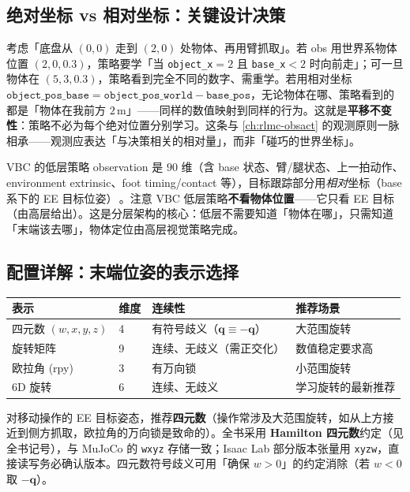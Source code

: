 \subsection{绝对坐标 vs 相对坐标：关键设计决策}
\label{sec:rlmc-lm-obs-rel}

\begin{insight}[相对坐标带来平移不变性]\label{ins:rlmc-lm-relcoord}
考虑「底盘从 $(0,0)$ 走到 $(2,0)$ 处物体、再用臂抓取」。若 obs 用世界系物体位置 $(2,0,0.3)$，策略要学「当 \texttt{object\_x}$=2$ 且 \texttt{base\_x}$<2$ 时向前走」；可一旦物体在 $(5,3,0.3)$，策略看到完全不同的数字、需重学。若用相对坐标 $\texttt{object\_pos\_base}=\texttt{object\_pos\_world}-\texttt{base\_pos}$，无论物体在哪、策略看到的都是「物体在我前方 $2\,$m」——同样的数值映射到同样的行为。这就是\textbf{平移不变性}：策略不必为每个绝对位置分别学习。这条与 \cref{ch:rlmc-obsact} 的观测原则一脉相承——观测应表达「与决策相关的相对量」，而非「碰巧的世界坐标」。
\end{insight}

VBC 的低层策略 observation 是 $90$ 维（含 base 状态、臂/腿状态、上一拍动作、environment extrinsic、foot timing/contact 等），目标跟踪部分用\emph{相对}坐标（base 系下的 EE 目标位姿）\,\cite{liu2024vbc}。注意 VBC 低层策略\textbf{不看物体位置}——它只看 EE 目标（由高层给出）。这是分层架构的核心：低层不需要知道「物体在哪」，只需知道「末端该去哪」，物体定位由高层视觉策略完成。

\subsection{配置详解：末端位姿的表示选择}
\label{sec:rlmc-lm-obs-quat}

\begin{center}
\small
\begin{tabular}{@{}llll@{}}
\toprule
表示 & 维度 & 连续性 & 推荐场景 \\
\midrule
四元数 $(w,x,y,z)$ & 4 & 有符号歧义（$\mathbf q\equiv-\mathbf q$） & 大范围旋转 \\
旋转矩阵 & 9 & 连续、无歧义（需正交化） & 数值稳定要求高 \\
欧拉角 (rpy) & 3 & 有万向锁 & 小范围旋转 \\
6D 旋转 & 6 & 连续、无歧义 & 学习旋转的最新推荐 \\
\bottomrule
\end{tabular}
\end{center}

对移动操作的 EE 目标姿态，推荐\textbf{四元数}（操作常涉及大范围旋转，如从上方接近到侧方抓取，欧拉角的万向锁是致命的）。全书采用 \textbf{Hamilton 四元数}约定（见全书记号），与 MuJoCo 的 \verb|wxyz| 存储一致；Isaac Lab 部分版本张量用 \verb|xyzw|，直接读写务必确认版本。四元数符号歧义可用「确保 $w>0$」的约定消除（若 $w<0$ 取 $-\mathbf q$）。

